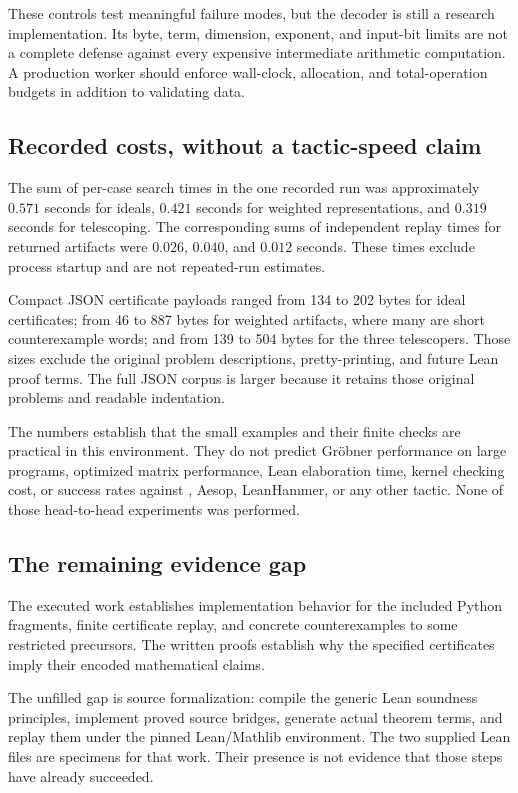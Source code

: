 These controls test meaningful failure modes, but the decoder is still a
research implementation. Its byte, term, dimension, exponent, and input-bit
limits are not a complete defense against every expensive intermediate
arithmetic computation. A production worker should enforce wall-clock,
allocation, and total-operation budgets in addition to validating data.

\subsection{Recorded costs, without a tactic-speed claim}

The sum of per-case search times in the one recorded run was approximately
$0.571$ seconds for ideals, $0.421$ seconds for weighted representations, and
$0.319$ seconds for telescoping. The corresponding sums of independent replay
times for returned artifacts were $0.026$, $0.040$, and $0.012$ seconds. These
times exclude process startup and are not repeated-run estimates.

Compact JSON certificate payloads ranged from 134 to 202 bytes for ideal
certificates; from 46 to 887 bytes for weighted artifacts, where many are short
counterexample words; and from 139 to 504 bytes for the three telescopers.
Those sizes exclude the original problem descriptions, pretty-printing, and
future Lean proof terms. The full JSON corpus is larger because it retains
those original problems and readable indentation.

The numbers establish that the small examples and their finite checks are
practical in this environment. They do not predict Gr\"obner performance on
large programs, optimized matrix performance, Lean elaboration time, kernel
checking cost, or success rates against \grind{}, Aesop, LeanHammer, or any
other tactic. None of those head-to-head experiments was performed.

\subsection{The remaining evidence gap}

The executed work establishes implementation behavior for the included Python
fragments, finite certificate replay, and concrete counterexamples to some
restricted precursors. The written proofs establish why the specified
certificates imply their encoded mathematical claims.

The unfilled gap is source formalization: compile the generic Lean soundness
principles, implement proved source bridges, generate actual theorem terms,
and replay them under the pinned Lean/Mathlib environment. The two supplied
Lean files are specimens for that work. Their presence is not evidence that
those steps have already succeeded.
